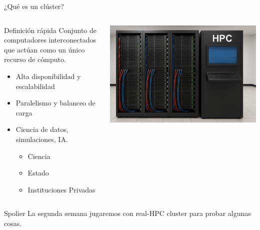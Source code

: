 \documentclass[aspectratio=169,professionalfonts]{beamer}
\begin{document}
\begin{frame}{¿Qué es un clúster?}
  \begin{columns}[T]
    \begin{column}{0.55\textwidth}
      \begin{block}{Definición rápida}
        Conjunto de computadores interconectados que actúan
        como un único recurso de cómputo.
      \end{block}
      \pause
      \begin{itemize}
        \item Alta disponibilidad y escalabilidad 
        \item Paralelismo y balanceo de carga
        \item Ciencia de datos, simulaciones, IA.
        \begin{itemize}
          \item Ciencia
          \item Estado
          \item Instituciones Privadas
        \end{itemize}
      \end{itemize}
    \end{column}
    \begin{column}{0.4\textwidth}
      \centering
      \includegraphics[width=\linewidth]{hpc1.png} %
    \end{column}
  \end{columns}
  \begin{block}{Spolier}
    La segunda semana jugaremos con real-HPC cluster para probar algunas cosas.
  \end{block}
\end{frame}
\end{document}
